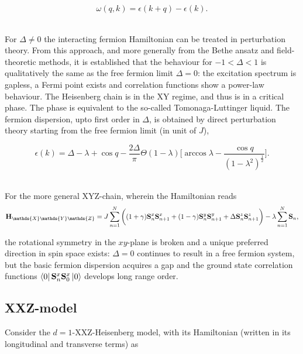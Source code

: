 \documentclass{homework}
\begin{document}
$$
    \omega(q,k) = \epsilon(k+q) - \epsilon(k).
$$

\blanky \\

For $\Delta \neq 0$ the interacting fermion Hamiltonian can be treated in perturbation theory. From this approach, and more generally from the Bethe ansatz and field-theoretic methods, it is established that the behaviour for $-1 < \Delta < 1$ is qualitatively the same as the free fermion limit $\Delta = 0$: the excitation spectrum is gapless, a Fermi point exists and correlation functions show a power-law behaviour. The Heisenberg chain is in the XY regime, and thus is in a critical phase. The phase is equivalent to the so-called Tomonaga-Luttinger liquid. The fermion dispersion, upto first order in $\Delta$, is obtained by direct perturbation theory starting from the free fermion limit (in unit of $J$), 

\begin{equation*}
    \epsilon(k) = \Delta - \lambda + \cos q - \frac{2\Delta}{\pi} \Theta(1-\lambda) \bigg[\arccos \lambda - \frac{\cos q}{(1-\lambda^2)^{\frac{1}{2}}}\bigg].
\end{equation*}

\blanky \\

For the more general XYZ-chain, wherein the Hamiltonian reads 
\begin{equation}
    \Hamiltonian_{\mathds{X}\mathds{Y}\mathds{Z}} = J \sum_{n=1}^{N} \bigg( (1+\gamma) \spin^{x}_{n} \spin^{x}_{n+1} + (1-\gamma) \spin^{y}_{n} \spin^{y}_{n+1} + \Delta \spin^{z}_{n} \spin_{n+1}^{z} \bigg) - \lambda \sum_{n=1}^{N} {\spin}_n,
\end{equation}

the rotational symmetry in the $xy$-plane is broken and a unique preferred direction in spin space exists: $\Delta = 0$ continues to result in a free fermion system, but the basic fermion dispersion acquires a gap and the ground state correlation functions $\bra{0}{{\bf S}}_n^x{{\bf S}}_0^x\ket{0}$
develops long range order. \\

\clearpage

\subsection{XXZ-model}

Consider the $d=1$-XXZ-Heisenberg model, with its Hamiltonian (written in its longitudinal and transverse terms) as 
\end{document}

